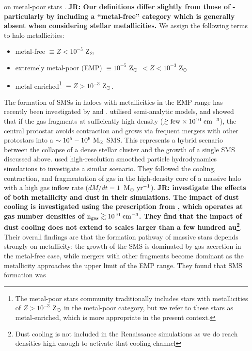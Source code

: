 \documentclass[twocolumn,iop,revtex4]{openjournal}
\newcommand{\msolaryrc} {$\rm{M_{\odot}~yr^{-1}}$}
\newcommand{\zsolar} {$\rm{Z_{\odot}}~$}
\newcommand{\zsolarc} {$\rm{Z_{\odot}}$}
\def\jr#1{{\color{blue} \bf JR:  #1}}
\begin{document}
on metal-poor stars \citep[e.g.][]{Frebel_2015}. \jr{Our definitions differ slightly from those of
\cite{Frebel_2015} - particularly by including a ``metal-free'' category which is generally
absent when considering stellar metallicities.} We assign the following terms to halo metallicities:
\begin{itemize}
\item metal-free $\equiv Z < 10^{-5}$ \zsolarc 
\item extremely metal-poor (EMP) $\equiv 10^{-5}$ \zsolar $< Z < 10^{-3}$ \zsolarc 
\item metal-enriched\footnote{The metal-poor stars community traditionally includes stars with
  metallicities of $Z > 10^{-3}$ \zsolar in the metal-poor category, but we refer to these stars as metal-enriched, which 
  is more appropriate in the present context.} $\equiv Z > 10^{-3}$ \zsolarc.
\end{itemize}
  The formation of SMSs in haloes with metallicities in the EMP range
  has recently been investigated by \cite{Tagawa_2020} and \cite{Chon_2020}. \cite{Tagawa_2020}
  utilised semi-analytic models, and showed that if the gas fragments at sufficiently high
  density ($\gtrsim {\rm few}\times 10^{10}~{\rm cm^{-3}}$), the central protostar avoids contraction
  and grows via frequent mergers with other protostars into a $\sim 10^5-10^6~{\rm M_\odot}$ SMS.
  This represents a hybrid scenario between the collapse of a dense stellar cluster and the
  growth of a single SMS discussed above. \cite{Chon_2020} used high-resolution smoothed particle
  hydrodynamics simulations to investigate a similar scenario. They followed the cooling,
  contraction, and fragmentation of gas in the high-density core of a massive halo with a high
  gas inflow rate ($dM/dt=1$~\msolaryrc). \jr{\cite{Chon_2020} investigate the effects of
    both metallicity and dust in their simulations. The impact of
    dust cooling is investigated using the prescription from \cite{Omukai_2008}, which operates
    at gas number densities of $\rm{n_{gas} \gtrsim 10^{10} \ cm^{-3}}$. They find
    that the impact of dust cooling does not extend to scales larger than a few hundred
    au\footnote{Dust cooling is not included in the Renaissance simulations as we do reach densities
      high enough to activate that cooling channel}}. Their overall findings are that the formation
  pathway of massive stars depends strongly on metallicity: the growth of the SMS is dominated by
  gas accretion in the metal-free case, while mergers with other fragments become dominant as
  the metallicity approaches the upper limit of the EMP range. They found that SMS formation was
\end{document}
